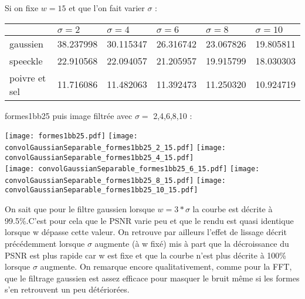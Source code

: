 \documentclass[12pt]{article}
\numberwithin{equation}{section}
\begin{document}
Si on fixe $w = 15$ et que l'on fait varier $\sigma$ :
\begin{center}
  \begin{tabular}{|l|l|l|l|l|l|}
    \hline
    & $\sigma = 2$ & $\sigma = 4$ & $\sigma = 6$  & $\sigma = 8$ & $\sigma = 10$ \\
    \hline
    gaussien & 38.237998  & 30.115347  & 26.316742 & 23.067826  & 19.805811\\
    \hline
    speeckle & 22.910568  & 22.094057 & 21.205957  &19.915799 & 18.030303 \\
    \hline
    poivre et sel & 11.716086  & 11.482063 & 11.392473  &  11.250320 & 10.924719\\
    \hline
  \end{tabular}
\end{center}


formes1bb25 puis image filtrée avec $\sigma =$ 2,4,6,8,10 :\\

\begin{center}
\texttt{[image: formes1bb25.pdf]}
\texttt{[image: convolGaussianSeparable\_formes1bb25\_2\_15.pdf]}
\texttt{[image: convolGaussianSeparable\_formes1bb25\_4\_15.pdf]}\\
\texttt{[image: convolGaussianSeparable\_formes1bb25\_6\_15.pdf]}
\texttt{[image: convolGaussianSeparable\_formes1bb25\_8\_15.pdf]}
\texttt{[image: convolGaussianSeparable\_formes1bb25\_10\_15.pdf]}\\
\end{center}

On sait que pour le filtre gaussien lorsque $w = 3*\sigma$ la courbe est décrite à 99.5\%.C'est pour cela que le PSNR varie peu et que le rendu est quasi identique lorsque w dépasse cette valeur. On retrouve par ailleurs l'effet de lissage décrit précédemment lorsque $\sigma$ augmente (à w fixé) mis à part que la décroissance du PSNR est plus rapide car w est fixe et que la courbe n'est plus décrite à 100\% lorsque $\sigma$ augmente. On remarque encore qualitativement, comme pour la FFT, que le filtrage gaussien est assez efficace pour masquer le bruit même si les formes s'en retrouvent un peu détériorées.
\end{document}
